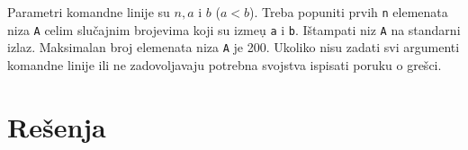\begin{Exercise}[label=v2.2_01] 
Parametri komandne linije su $n, a$ i $b$ ($a < b$). Treba popuniti
prvih {\tt n} elemenata niza {\tt A} celim slu\v cajnim brojevima koji
su izme\d u {\tt a} i {\tt b}. I\v stampati niz {\tt A} na standarni
izlaz. Maksimalan broj elemenata niza {\tt A} je 200. Ukoliko nisu
zadati svi argumenti komandne linije ili ne zadovoljavaju potrebna
svojstva ispisati poruku o gre\v sci. \\
\end{Exercise}
\begin{Answer}[ref=v2.2_01]
\end{Answer}



\section{Rešenja}
\shipoutAnswer
